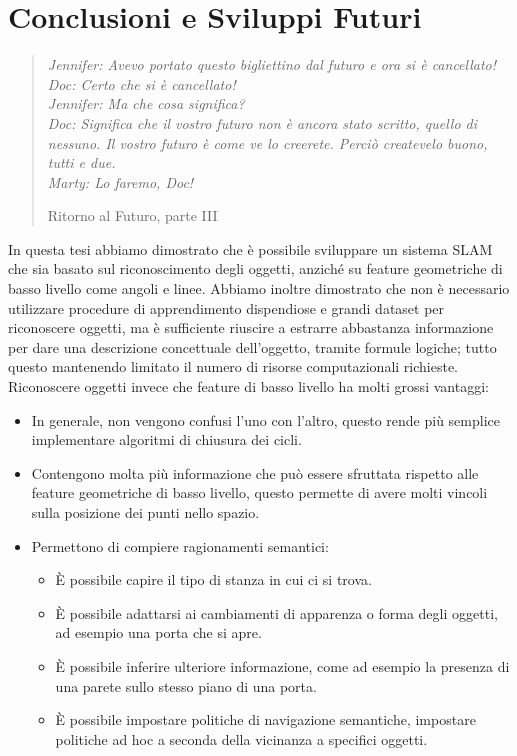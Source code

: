 \chapter{Conclusioni e Sviluppi Futuri}
\label{cap:sviluppi}
\thispagestyle{empty}

\begin{quotation}
{\footnotesize
\noindent\emph{Jennifer: Avevo portato questo bigliettino dal futuro e ora si è cancellato! \\
Doc: Certo che si è cancellato! \\
Jennifer: Ma che cosa significa? \\
Doc: Significa che il vostro futuro non è ancora stato scritto, quello di nessuno. Il vostro futuro è come ve lo creerete. Perciò createvelo buono, tutti e due. \\
Marty: Lo faremo, Doc!}
\begin{flushright}
Ritorno al Futuro, parte III
\end{flushright}
}
\end{quotation}
\vspace{0.5cm}

In questa tesi abbiamo dimostrato che è possibile sviluppare un sistema SLAM che sia basato sul riconoscimento degli oggetti, anziché su feature geometriche di basso livello come angoli e linee. Abbiamo inoltre dimostrato che non è necessario utilizzare procedure di apprendimento dispendiose e grandi dataset per riconoscere oggetti, ma è sufficiente riuscire a estrarre abbastanza informazione per dare una descrizione concettuale dell'oggetto, tramite formule logiche; tutto questo mantenendo limitato il numero di risorse computazionali richieste.
Riconoscere oggetti invece che feature di basso livello ha molti grossi vantaggi:
\begin{itemize}
 \item In generale, non vengono confusi l'uno con l'altro, questo rende più semplice implementare algoritmi di chiusura dei cicli.
 \item Contengono molta più informazione che può essere sfruttata rispetto alle feature geometriche di basso livello, questo permette di avere molti vincoli sulla posizione dei punti nello spazio.
 \item Permettono di compiere ragionamenti semantici: 
  \begin{itemize}
   \item \`E possibile capire il tipo di stanza in cui ci si trova.
   \item \`E possibile adattarsi ai cambiamenti di apparenza o forma degli oggetti, ad esempio una porta che si apre.
   \item \`E possibile inferire ulteriore informazione, come ad esempio la presenza di una parete sullo stesso piano di una porta.
   \item \`E possibile impostare politiche di navigazione semantiche, impostare politiche ad hoc a seconda della vicinanza a specifici oggetti.
  \end{itemize}
\end{itemize}

